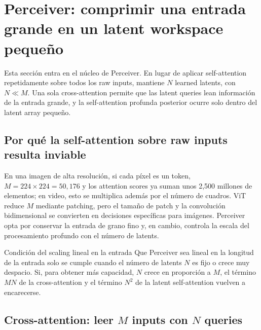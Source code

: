 \section{Perceiver: comprimir una entrada grande en un latent workspace pequeño}

Esta sección entra en el núcleo de Perceiver. En lugar de aplicar self-attention repetidamente sobre todos los raw inputs, mantiene $N$ learned latents, con $N\ll M$. Una sola cross-attention permite que las latent queries lean información de la entrada grande, y la self-attention profunda posterior ocurre solo dentro del latent array pequeño.


\subsection{Por qué la self-attention sobre raw inputs resulta inviable}

En una imagen de alta resolución, si cada píxel es un token, $M=224\times224=50{,}176$ y los attention scores ya suman unos 2,500 millones de elementos; en video, esto se multiplica además por el número de cuadros. ViT reduce $M$ mediante patching, pero el tamaño de patch y la convolución bidimensional se convierten en decisiones específicas para imágenes. Perceiver opta por conservar la entrada de grano fino y, en cambio, controla la escala del procesamiento profundo con el número de latents.


\begin{warningbox}{Condición del scaling lineal en la entrada}
Que Perceiver sea lineal en la longitud de la entrada solo se cumple cuando el número de latents $N$ es fijo o crece muy despacio. Si, para obtener más capacidad, $N$ crece en proporción a $M$, el término $MN$ de la cross-attention y el término $N^2$ de la latent self-attention vuelven a encarecerse.
\end{warningbox}

\subsection{Cross-attention: leer $M$ inputs con $N$ queries}

